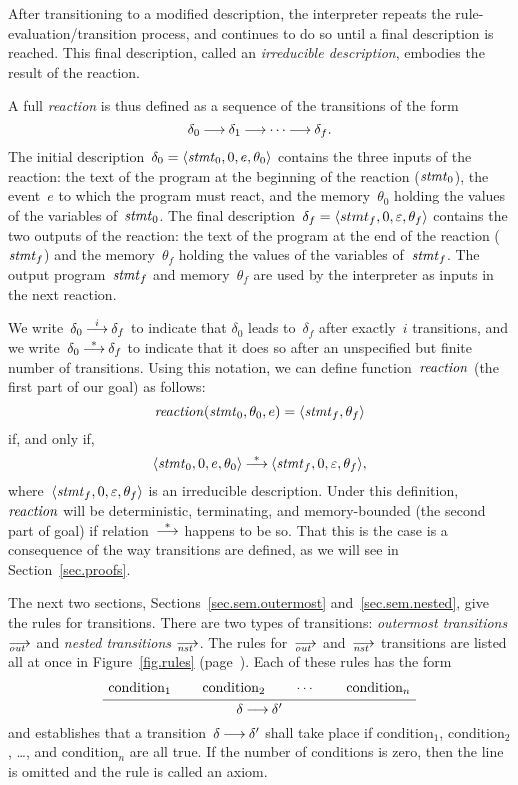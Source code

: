 After transitioning to a modified description, the interpreter repeats the
rule-evaluation/transition process, and continues to do so until a final
description is reached.  This final description, called an \emph{irreducible
  description}, embodies the result of the reaction.

A full \emph{reaction} is thus defined as a sequence of the transitions of
the form
\[
  \delta_0\trans\delta_1\trans\cdots\trans\delta_f.
\]
The initial description~$\delta_0=\<\stmt_0,0,e,\theta_0>$ contains the
three inputs of the reaction: the text of the program at the beginning of
the reaction ($\mathit{stmt}_0$), the event~$e$ to which the program must react, and
the memory~$\theta_0$ holding the values of the variables of~$\mathit{stmt}_0$.  The
final description~$\delta_f=\<stmt_f,0,\nil,\theta_f>$ contains the two
outputs of the reaction: the text of the program at the end of the reaction
($\mathit{stmt}_f$) and the memory~$\theta_f$ holding the values of the variables
of~$\mathit{stmt}_f$.  The output program~$\mathit{stmt}_f$ and memory~$\theta_f$ are used
by the interpreter as inputs in the next reaction.

We write~$\delta_0\trans[i]\delta_f$ to indicate that $\delta_0$ leads
to~$\delta_f$ after exactly~$i$ transitions, and we
write~$\delta_0\trans[*]\delta_f$ to indicate that it does so after an
unspecified but finite number of transitions.  Using this notation, we can
define function~$\mathop{\mathit{reaction}}$ (the first part of our goal) as follows:
\[
  \reaction(\stmt_0,\theta_0,e)=\<\stmt_f,\theta_f>
\]
if, and only if,
\[
  \<\stmt_0,0,e,\theta_0>\trans[*]\<\stmt_f,0,\nil,\theta_f>,
\]
where~$\<\stmt_f,0,\nil,\theta_f>$ is an irreducible description.  Under
this definition, $\mathop{\mathit{reaction}}$ will be deterministic, terminating, and
memory-bounded (the second part of goal) if relation~$\trans[*]$ happens to
be so.  That this is the case is a consequence of the way transitions are
defined, as we will see in Section~\ref{sec.proofs}.

The next two sections, Sections~\ref{sec.sem.outermost}
and~\ref{sec.sem.nested}, give the rules for transitions.  There are two
types of transitions: \emph{outermost transitions} $\out$ and \emph{nested
  transitions} $\nst$.  The rules for~$\out$ and~$\nst$ transitions are
listed all at once in Figure~\ref{fig.rules} (page~\pageref{fig.rules}).
Each of these rules has the form
\[
  \AxiomC{\strut condition$_1$}
  \AxiomC{\strut condition$_2$}
  \AxiomC{$\cdots$}
  \AxiomC{\strut condition$_n$}
  \QuaternaryInfC{$\delta\trans\delta'$}
  \DisplayProof
\]
and establishes that a transition~$\delta\trans\delta'$ shall take place if
condition$_1$, condition$_2$, \dots, and condition$_n$ are all true.  If the
number of conditions is zero, then the line is omitted and the rule is
called an axiom.

